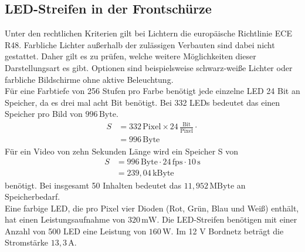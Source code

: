 \subsection{LED-Streifen in der Frontschürze}
Unter den rechtlichen Kriterien gilt bei Lichtern die europäische Richtlinie ECE R48. Farbliche Lichter außerhalb der zulässigen Verbauten sind dabei nicht gestattet. Daher gilt es zu prüfen, welche weitere Möglichkeiten dieser Darstellungsart es gibt. Optionen sind beispielsweise schwarz-weiße Lichter oder farbliche Bildschirme ohne aktive Beleuchtung. \\
Für eine Farbtiefe von 256 Stufen pro Farbe benötigt jede einzelne LED 24 Bit an Speicher, da es drei mal acht Bit benötigt. Bei 332 LEDs bedeutet das einen Speicher pro Bild von $ 996\,\mathrm{Byte} $.
\begin{align}
	S &= 332\,\mathrm{Pixel} \times 24\,\frac{\mathrm{Bit}}{\mathrm{Pixel}} \cdot \\
	&=  996\,\mathrm{Byte}
\end{align}
Für ein Video von zehn Sekunden Länge wird ein Speicher S von 
\begin{align}
	S &= 996\,\mathrm{Byte} \cdot 24\,\mathrm{fps} \cdot 10\,\mathrm{s}\\
	&= 239,04\,\mathrm{kByte}
\end{align}
benötigt. Bei insgesamt 50 Inhalten bedeutet das $ 11,952\,\mathrm{MByte} $ an Speicherbedarf. \\
Eine farbige LED, die pro Pixel vier Dioden (Rot, Grün, Blau und Weiß) enthält, hat einen Leistungsaufnahme von $ 320\,\mathrm{mW} $.  
Die LED-Streifen benötigen mit einer Anzahl von 500 LED eine Leistung von $ 160\,\mathrm{W} $. Im 12 V Bordnetz beträgt die Stromstärke $ 13,3\,\mathrm{A} $. 
